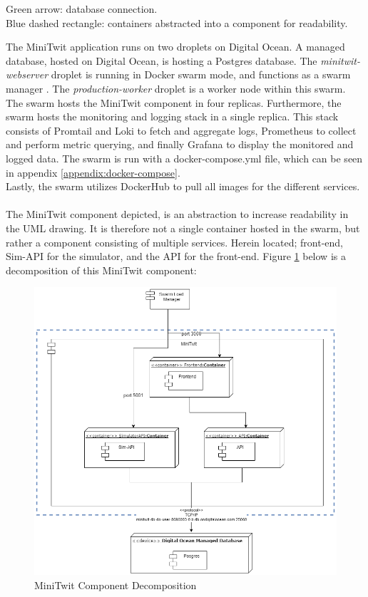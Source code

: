 \noindent Green arrow: database connection. \\
Blue dashed rectangle: containers abstracted into a component for readability.

\noindent
The MiniTwit application runs on two droplets on Digital Ocean. A managed database, hosted on Digital Ocean, is hosting a Postgres database. The \textit{minitwit-webserver} droplet is running in Docker swarm mode, and functions as a swarm manager \cite{docker-swarm}. The \textit{production-worker} droplet is a worker node within this swarm. The swarm hosts the MiniTwit component in four replicas. Furthermore, the swarm hosts the monitoring and logging stack in a single replica. This stack consists of Promtail and Loki to fetch and aggregate logs, Prometheus to collect and perform metric querying, and finally Grafana to display the monitored and logged data. The swarm is run with a docker-compose.yml file, which can be seen in appendix \ref{appendix:docker-compose}. \\
Lastly, the swarm utilizes DockerHub to pull all images for the different services.\\
\\
The MiniTwit component depicted, is an abstraction to increase readability in the UML drawing. It is therefore not a single container hosted in the swarm, but rather a component consisting of multiple services. Herein located; front-end, Sim-API for the simulator, and the API for the front-end.
Figure \ref{fig:minitwit-decomposition} below is a decomposition of this MiniTwit component:

\begin{figure}[H]
    \centering
    \includegraphics[width=1\linewidth]{report/images/minitwit-decomposition.png}
    \caption{MiniTwit Component Decomposition}
    \label{fig:minitwit-decomposition}
\end{figure}

